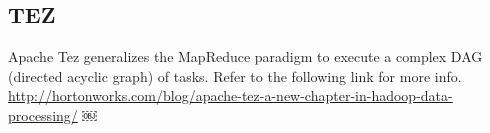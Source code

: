 \documentclass{vldb}
\begin{document}
\subsection*{TEZ}
Apache Tez generalizes the MapReduce paradigm to execute a complex DAG (directed acyclic graph) of tasks. Refer to the following link for more info. 
\href{http://hortonworks.com/blog/apache-tez-a-new-chapter-in-hadoop-data-processing/}{http://hortonworks.com/blog/apache-tez-a-new-chapter-in-hadoop-data-processing/}
￼
\end{document}
